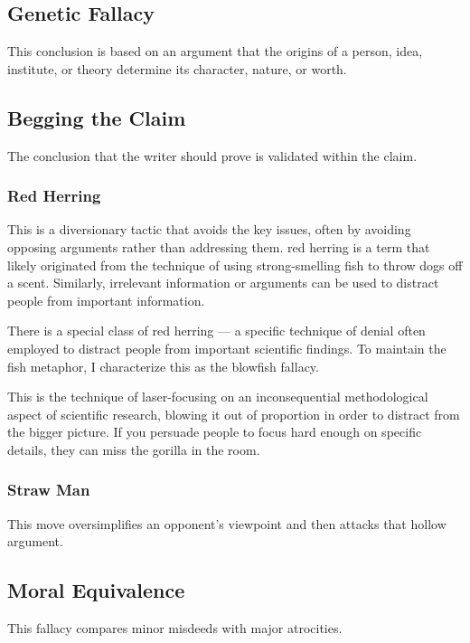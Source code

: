 \documentclass{article}\usepackage[]{graphicx}\usepackage[]{color}
\begin{document}
\subsection{Genetic Fallacy}

This conclusion is based on an argument that the origins of a person, idea, institute, or theory determine its character, nature, or worth.

\subsection{Begging the Claim} 

The conclusion that the writer should prove is validated within the claim. 

\subsubsection{Red Herring}

This is a diversionary tactic that avoids the key issues, often by avoiding opposing arguments rather than addressing them. red herring is a term that likely originated from the technique of using strong-smelling fish to throw dogs off a scent. Similarly, irrelevant information or arguments can be used to distract people from important information.

There is a special class of red herring — a specific technique of denial often employed to distract people from important scientific findings. To maintain the fish metaphor, I characterize this as the blowfish fallacy.

This is the technique of laser-focusing on an inconsequential methodological aspect of scientific research, blowing it out of proportion in order to distract from the bigger picture. If you persuade people to focus hard enough on specific details, they can miss the gorilla in the room.

\subsubsection{Straw Man}

This move oversimplifies an opponent's viewpoint and then attacks that hollow argument.

\subsection{Moral Equivalence}

This fallacy compares minor misdeeds with major atrocities.
\end{document}
